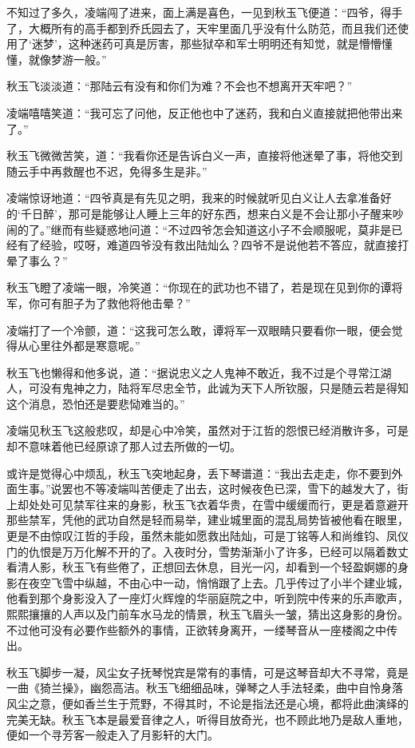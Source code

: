 不知过了多久，凌端闯了进来，面上满是喜色，一见到秋玉飞便道：“四爷，得手了，大概所有的高手都到乔氏园去了，天牢里面几乎没有什么防范，而且我们还使用了‘迷梦’，这种迷药可真是厉害，那些狱卒和军士明明还有知觉，就是懵懵懂懂，就像梦游一般。”

秋玉飞淡淡道：“那陆云有没有和你们为难？不会也不想离开天牢吧？”

凌端嘻嘻笑道：“我可忘了问他，反正他也中了迷药，我和白义直接就把他带出来了。”

秋玉飞微微苦笑，道：“我看你还是告诉白义一声，直接将他迷晕了事，将他交到随云手中再救醒也不迟，免得多生是非。”

凌端惊讶地道：“四爷真是有先见之明，我来的时候就听见白义让人去拿准备好的‘千日醉’，那可是能够让人睡上三年的好东西，想来白义是不会让那小子醒来吵闹的了。”继而有些疑惑地问道：“不过四爷怎会知道这小子不会顺服呢，莫非是已经有了经验，哎呀，难道四爷没有救出陆灿么？四爷不是说他若不答应，就直接打晕了事么？”

秋玉飞瞪了凌端一眼，冷笑道：“你现在的武功也不错了，若是现在见到你的谭将军，你可有胆子为了救他将他击晕？”

凌端打了一个冷颤，道：“这我可怎么敢，谭将军一双眼睛只要看你一眼，便会觉得从心里往外都是寒意呢。”

秋玉飞也懒得和他多说，道：“据说忠义之人鬼神不敢近，我不过是个寻常江湖人，可没有鬼神之力，陆将军尽忠全节，此诚为天下人所钦服，只是随云若是得知这个消息，恐怕还是要悲恸难当的。”

凌端见秋玉飞这般悲叹，却是心中冷笑，虽然对于江哲的怨恨已经消散许多，可是却不意味着他已经原谅了那人过去所做的一切。

或许是觉得心中烦乱，秋玉飞突地起身，丢下琴谱道：“我出去走走，你不要到外面生事。”说罢也不等凌端叫苦便走了出去，这时候夜色已深，雪下的越发大了，街上却处处可见禁军往来的身影，秋玉飞衣着华贵，在雪中缓缓而行，更是着意避开那些禁军，凭他的武功自然是轻而易举，建业城里面的混乱局势皆被他看在眼里，更是不由惊叹江哲的手段，虽然未能如愿救出陆灿，可是丁铭等人和尚维钧、凤仪门的仇恨是万万化解不开的了。入夜时分，雪势渐渐小了许多，已经可以隔着数丈看清人影，秋玉飞有些倦了，正想回去休息，目光一闪，却看到一个轻盈婀娜的身影在夜空飞雪中纵越，不由心中一动，悄悄跟了上去。几乎传过了小半个建业城，他看到那个身影没入了一座灯火辉煌的华丽庭院之中，听到院中传来的乐声歌声，熙熙攘攘的人声以及门前车水马龙的情景，秋玉飞眉头一皱，猜出这身影的身份。不过他可没有必要作些额外的事情，正欲转身离开，一缕琴音从一座楼阁之中传出。

秋玉飞脚步一凝，风尘女子抚琴悦宾是常有的事情，可是这琴音却大不寻常，竟是一曲《猗兰操》，幽怨高洁。秋玉飞细细品味，弹琴之人手法轻柔，曲中自怜身落风尘之意，便如香兰生于荒野，不得其时，不论是指法还是心境，都将此曲演绎的完美无缺。秋玉飞本是最爱音律之人，听得目放奇光，也不顾此地乃是敌人重地，便如一个寻芳客一般走入了月影轩的大门。


